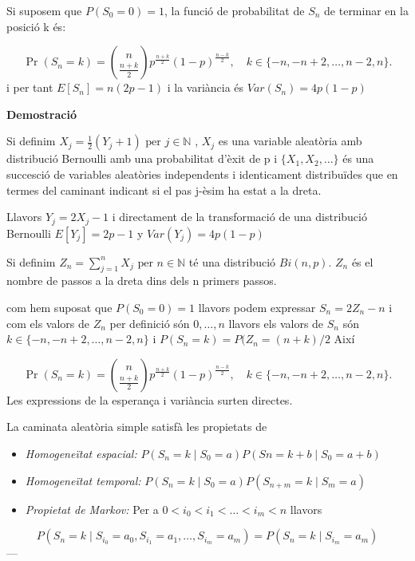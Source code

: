 \documentclass[
  catalan,
]{article}
\theoremstyle{definition}
\theoremstyle{definition}
\theoremstyle{definition}
\theoremstyle{definition}
\theoremstyle{remark}
\begin{document}
Si suposem que \(P(S_0=0)=1\), la funció de probabilitat de \(S_n\) de terminar en la posició k és:

\[
\Pr(S_n = k) = \binom{n}{\frac{n+k}{2}} p^{\frac{n+k}{2}} (1-p)^{\frac{n-k}{2}}, \quad k \in \{-n, -n+2, \dots, n-2, n\}.  \label{eq:prwalk}
\]
i per tant \(E[S_n]=n(2p-1)\) i la variància és \(Var(S_n)=4p(1-p)\)

\textbf{Demostració}

Si definim \(X_j=\frac{1}{2}(Y_j+1) \text{ per } j \in \mathbb{N}\) , \(X_j\) es una variable aleatòria amb distribució Bernoulli amb una probabilitat d'èxit de p i \(\{X_1,X_2,\dots\}\) és una succesció de variables aleatòries independents i identicament distribuïdes que en termes del caminant indicant si el pas j-èsim ha estat a la dreta.

Llavors \(Y_j=2X_j-1\) i directament de la transformació de una distribució Bernoulli \(E[Y_j]=2p-1\) y \(Var(Y_j)=4p(1-p)\)

Si definim \(Z_n=\sum_{j=1}^n X_j \text{ per }  n \in \mathbb{N}\) té una distribució \(Bi(n,p)\). \(Z_n\) és el nombre de passos a la dreta dins dels n primers passos.

com hem suposat que \(P(S_0=0)=1\) llavors podem expressar \(S_n=2Z_n-n\) i com els valors de \(Z_n\) per definició són \(0,\dots,n\) llavors els valors de \(S_n\) són \(k \in \{-n, -n+2,\dots,n-2,n \}\) i \(P(S_n=k)=P(Z_n=(n+k)/2\)
Així

\[
\Pr(S_n = k) = \binom{n}{\frac{n+k}{2}} p^{\frac{n+k}{2}} (1-p)^{\frac{n-k}{2}}, \quad k \in \{-n, -n+2, \dots, n-2, n\}.
\]
Les expressions de la esperança i variància surten directes.

La caminata aleatòria simple satisfà les propietats de

\begin{itemize}
\item
  \emph{Homogeneïtat espacial:} \(P(S_n=k\mid S_0=a)P(Sn=k+b\mid S_0=a+b )\)
\item
  \emph{Homogeneïtat temporal:} \(P(S_n=k\mid S_0=a)P(S_{n+m}=k\mid S_m=a )\)
\item
  \emph{Propietat de Markov:} Per a \(0<i_0<i_1<\dots<i_m<n\) llavors
\end{itemize}

\[
P(S_n=k\mid S_{i_0}=a_0,S_{i_1}=a_1,\dots, S_{i_m}=a_m)=P(S_n=k\mid S_{i_m}=a_m)
\]
---
\end{document}
